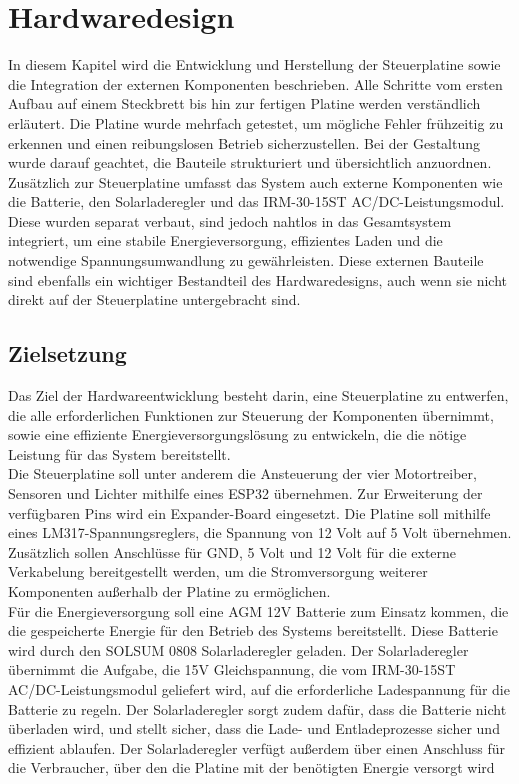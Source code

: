 \documentclass[ngerman,12pt,a4paper]{article}
\begin{document}
	\section{Hardwaredesign}

	In diesem Kapitel wird die Entwicklung und Herstellung der Steuerplatine sowie die Integration der externen Komponenten beschrieben. Alle Schritte vom ersten Aufbau auf einem Steckbrett bis hin zur fertigen Platine werden verständlich erläutert. Die Platine wurde mehrfach getestet, um mögliche Fehler frühzeitig zu erkennen und einen reibungslosen Betrieb sicherzustellen. Bei der Gestaltung wurde darauf geachtet, die Bauteile strukturiert und übersichtlich anzuordnen. \\[0.4cm]
	Zusätzlich zur Steuerplatine umfasst das System auch externe Komponenten wie die Batterie, den Solarladeregler und das IRM-30-15ST AC/DC-Leistungsmodul. Diese wurden separat verbaut, sind jedoch nahtlos in das Gesamtsystem integriert, um eine stabile Energieversorgung, effizientes Laden und die notwendige Spannungsumwandlung zu gewährleisten. Diese externen Bauteile sind ebenfalls ein wichtiger Bestandteil des Hardwaredesigns, auch wenn sie nicht direkt auf der Steuerplatine untergebracht sind.
	
	
		\subsection{Zielsetzung} %
		
		Das Ziel der Hardwareentwicklung besteht darin, eine Steuerplatine zu entwerfen, die alle erforderlichen Funktionen zur Steuerung der Komponenten übernimmt, sowie eine effiziente Energieversorgungslösung zu entwickeln, die die nötige Leistung für das System bereitstellt.\\[0.4cm] 
		Die Steuerplatine soll unter anderem die Ansteuerung der vier Motortreiber, Sensoren und Lichter mithilfe eines ESP32 übernehmen. Zur Erweiterung der verfügbaren Pins wird ein Expander-Board eingesetzt. Die Platine soll mithilfe eines LM317-Spannungsreglers, die Spannung von 12 Volt auf 5 Volt übernehmen. Zusätzlich sollen Anschlüsse für GND, 5 Volt und 12 Volt für die externe Verkabelung bereitgestellt werden, um die Stromversorgung weiterer Komponenten außerhalb der Platine zu ermöglichen.\\[0.4cm]
		Für die Energieversorgung soll eine AGM 12V Batterie zum Einsatz kommen, die die gespeicherte Energie für den Betrieb des Systems bereitstellt. Diese Batterie wird durch den SOLSUM 0808 Solarladeregler geladen. Der Solarladeregler übernimmt die Aufgabe, die 15V Gleichspannung, die vom IRM-30-15ST AC/DC-Leistungsmodul geliefert wird, auf die erforderliche Ladespannung für die Batterie zu regeln. Der Solarladeregler sorgt zudem dafür, dass die Batterie nicht überladen wird, und stellt sicher, dass die Lade- und Entladeprozesse sicher und effizient ablaufen. Der Solarladeregler verfügt außerdem über einen Anschluss für die Verbraucher, über den die Platine mit der benötigten Energie versorgt wird
		
\end{document}
